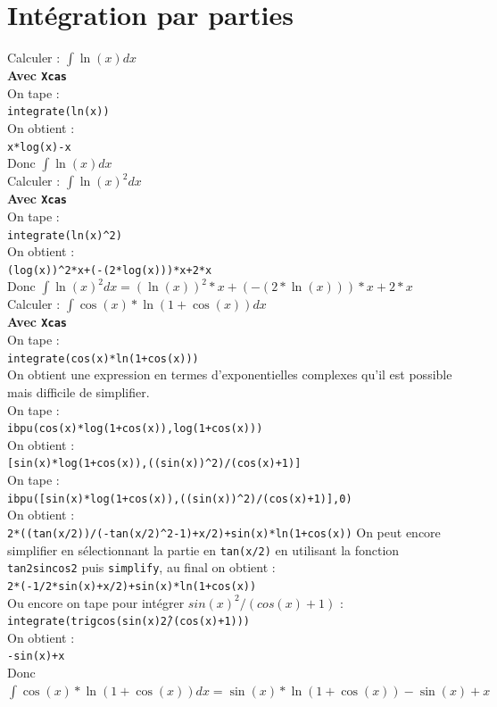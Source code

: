 \documentclass[a4paper,11pt]{book}
\begin{document}
\section{Int\'egration par parties}
Calculer : $\int \ln(x)dx$\\
{\bf Avec {\tt Xcas}}\\
On tape :\\
{\tt integrate(ln(x))}\\   
On obtient :\\
{\tt x*log(x)-x}\\
Donc $\int \ln(x)dx$\\

Calculer : $\int \ln(x)^2dx$\\
{\bf Avec {\tt Xcas}}\\
On tape :\\
{\tt integrate(ln(x)\verb|^|2)}\\   
On obtient :\\
{\tt (log(x))\verb|^|2*x+(-(2*log(x)))*x+2*x}\\
Donc $\int \ln(x)^2dx=(\ln(x))^2*x+(-(2*\ln(x)))*x+2*x$\\

Calculer : $\int \cos(x)*\ln(1+\cos(x))dx$\\
{\bf Avec {\tt Xcas}}\\
On tape :\\
{\tt integrate(cos(x)*ln(1+cos(x)))}\\   
On obtient une expression en termes d'exponentielles complexes qu'il
est possible mais difficile de simplifier.\\
On tape :\\
{\tt ibpu(cos(x)*log(1+cos(x)),log(1+cos(x)))}\\   
On obtient :\\
{\tt [sin(x)*log(1+cos(x)),((sin(x))\verb|^|2)/(cos(x)+1)]}\\
On tape :\\
{\tt ibpu([sin(x)*log(1+cos(x)),((sin(x))\verb|^|2)/(cos(x)+1)],0)}\\   
On obtient :\\
{\tt 2*((tan(x/2))/(-tan(x/2)\verb|^|2-1)+x/2)+sin(x)*ln(1+cos(x))}
On peut encore simplifier en s\'electionnant la partie en {\tt tan(x/2)} 
en utilisant la fonction {\tt tan2sincos2}
puis {\tt simplify}, au final on obtient :\\
{\tt 2*(-1/2*sin(x)+x/2)+sin(x)*ln(1+cos(x))}\\
Ou encore on tape pour int\'egrer $sin(x)^2/(cos(x)+1)$ :\\
{\tt integrate(trigcos(sin(x)\^2/(cos(x)+1)))}\\
On obtient :\\
{\tt -sin(x)+x}\\
Donc $\int \cos(x)*\ln(1+\cos(x))dx=\sin(x)*\ln(1+\cos(x))-\sin(x)+x$
\end{document}
